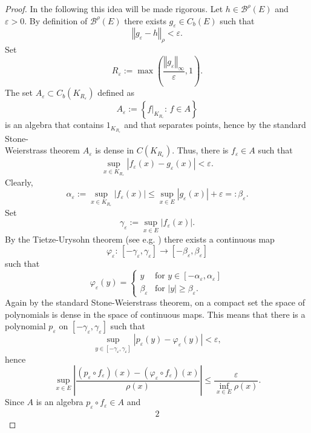 \documentclass[a4paper,12pt]{article}
\theoremstyle{definition}
\theoremstyle{remark}
\numberwithin{equation}{section}
\numberwithin{theorem}{section}
\begin{document}
\begin{proof}
In the following this idea will be made rigorous. Let $h\in\mathcal{\mathscr{B}}^{\rho}(E)$
and $\varepsilon>0$. By definition of $\mathcal{\mathscr{B}}^{\rho}(E)$
there exists $g_{\varepsilon}\in C_{b}(E)$ such that 
\[
\left\Vert g_{\varepsilon}-h\right\Vert _{\rho}<\varepsilon.
\]
Set 
\[
R_{\varepsilon}:=\max\left(\frac{\left\Vert g_{\varepsilon}\right\Vert _{\infty}}{\varepsilon},1\right).
\]
The set $A_{\varepsilon}\subset C_{b}(K_{R_{\varepsilon}})$ defined
as 
\[
A_{\varepsilon}:=\left\{ \left.f\right|_{K_{R_{\varepsilon}}}:\,f\in A\right\} 
\]
is an algebra that contains $1_{K_{R_{\varepsilon}}}$ and that separates
points, hence by the standard  Stone-\\Weierstrass theorem $A_{\varepsilon}$ is
dense in $C(K_{R_{\varepsilon}}).$ Thus, there is $f_{\varepsilon}\in A$
such that 
\[
\underset{x\in K_{R_{\varepsilon}}}{\sup}\left|f_{\varepsilon}(x)-g_{\varepsilon}(x)\right|<\varepsilon.
\]
Clearly, 
\[
\alpha_{\varepsilon}:=\underset{x\in K_{R_{\varepsilon}}}{\sup}\left|f_{\varepsilon}(x)\right|\leq\underset{x\in E}{\sup}\left|g_{\varepsilon}(x)\right|+\varepsilon=:\beta_{\varepsilon}.
\]
Set 
\[
\gamma_{\varepsilon}:=\underset{x\in E}{\sup}\left|f_{\varepsilon}(x)\right|.
\]
By the Tietze-Urysohn theorem (see e.g. \cite{kelley2017general}) 
there exists a continuous map 
\[
\varphi_{\varepsilon}:\,\left[-\gamma_{\varepsilon},\gamma_{\varepsilon}\right]\rightarrow\left[-\beta_{\varepsilon},\beta_{\varepsilon}\right]
\]
such that
\[
\varphi_{\varepsilon}(y)=\begin{cases}
y & \text{for }y\in\left[-\alpha_{\varepsilon},\alpha_{\varepsilon}\right]\\
\beta_{\varepsilon} & \text{for }\left|y\right|\geq\beta_{\varepsilon}.
\end{cases}
\]
Again by the standard Stone-Weierstrass theorem, on a compact set the
space of polynomials is dense in the space of continuous maps. This
means that there is a polynomial $p_{\varepsilon}$ on $\left[-\gamma_{\varepsilon},\gamma_{\varepsilon}\right]$
such that 
\[
\underset{y\in\left[-\gamma_{\varepsilon},\gamma_{\varepsilon}\right]}{\sup}\left|p_{\varepsilon}(y)-\varphi_{\varepsilon}(y)\right|<\varepsilon,
\]
hence
\[
\underset{x\in E}{\sup}\left|\frac{\left(p_{\varepsilon}\circ f_{\varepsilon}\right)(x)-\left(\varphi_{\varepsilon}\circ f_{\varepsilon}\right)(x)}{\rho(x)}\right|\leq\frac{\varepsilon}{\underset{x\in E}{\inf}\rho(x)}.
\]
Since $A$ is an algebra $p_{\varepsilon}\circ f_{\varepsilon}\in A$
and 
\begin{alignat*}{2}

\end{alignat*}
\end{proof}
\end{document}

